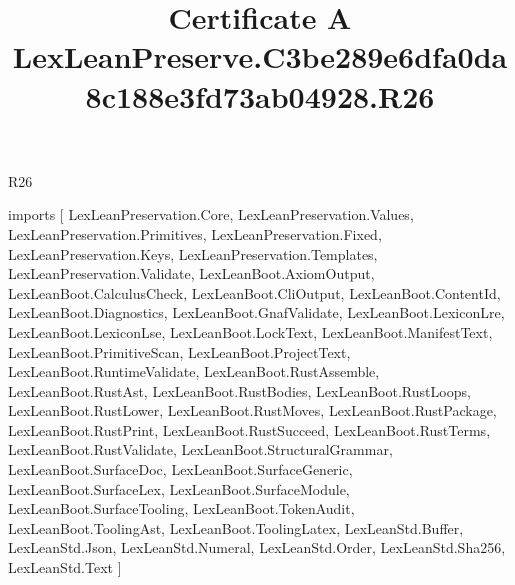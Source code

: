 \begin{lexlean}{R26}
\title{Certificate A LexLeanPreserve.C3be289e6dfa0da8c188e3fd73ab04928.R26}
\begin{coremodule}
imports [
  LexLeanPreservation.Core,
  LexLeanPreservation.Values,
  LexLeanPreservation.Primitives,
  LexLeanPreservation.Fixed,
  LexLeanPreservation.Keys,
  LexLeanPreservation.Templates,
  LexLeanPreservation.Validate,
  LexLeanBoot.AxiomOutput,
  LexLeanBoot.CalculusCheck,
  LexLeanBoot.CliOutput,
  LexLeanBoot.ContentId,
  LexLeanBoot.Diagnostics,
  LexLeanBoot.GnafValidate,
  LexLeanBoot.LexiconLre,
  LexLeanBoot.LexiconLse,
  LexLeanBoot.LockText,
  LexLeanBoot.ManifestText,
  LexLeanBoot.PrimitiveScan,
  LexLeanBoot.ProjectText,
  LexLeanBoot.RuntimeValidate,
  LexLeanBoot.RustAssemble,
  LexLeanBoot.RustAst,
  LexLeanBoot.RustBodies,
  LexLeanBoot.RustLoops,
  LexLeanBoot.RustLower,
  LexLeanBoot.RustMoves,
  LexLeanBoot.RustPackage,
  LexLeanBoot.RustPrint,
  LexLeanBoot.RustSucceed,
  LexLeanBoot.RustTerms,
  LexLeanBoot.RustValidate,
  LexLeanBoot.StructuralGrammar,
  LexLeanBoot.SurfaceDoc,
  LexLeanBoot.SurfaceGeneric,
  LexLeanBoot.SurfaceLex,
  LexLeanBoot.SurfaceModule,
  LexLeanBoot.SurfaceTooling,
  LexLeanBoot.TokenAudit,
  LexLeanBoot.ToolingAst,
  LexLeanBoot.ToolingLatex,
  LexLeanStd.Buffer,
  LexLeanStd.Json,
  LexLeanStd.Numeral,
  LexLeanStd.Order,
  LexLeanStd.Sha256,
  LexLeanStd.Text
]


\end{coremodule}
\end{lexlean}
